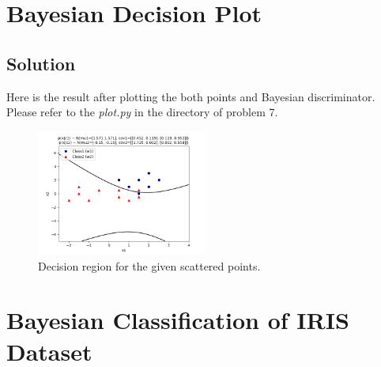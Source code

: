 \documentclass[12pt]{article}
\numberwithin{equation}{section}
\numberwithin{table}{section}
\numberwithin{figure}{section}
\begin{document}
\newpage
\section{Bayesian Decision Plot}
\subsection*{Solution}
Here is the result after plotting the both points and Bayesian discriminator. Please refer to the \textit{plot.py} in the directory of problem 7.
\begin{figure}[!h]\centering
	\includegraphics[width=0.5\textwidth]{7.png}
	\caption{Decision region for the given scattered points.}
	\label{pl7}
\end{figure}

\section{Bayesian Classification of IRIS Dataset}
\end{document}
